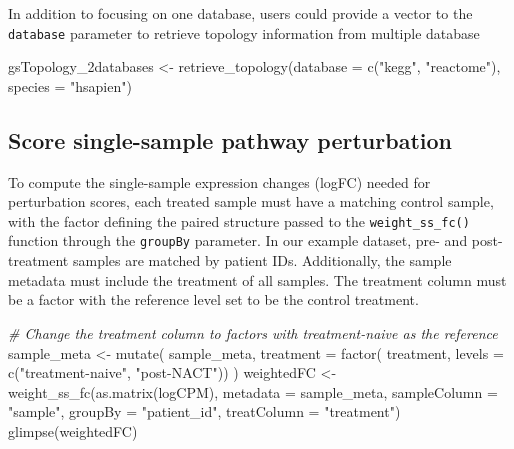 \documentclass[9pt,a4paper,]{extarticle}
\newenvironment{Shaded}{\begin{snugshade}}{\end{snugshade}}
\newcommand{\AttributeTok}[1]{\textcolor[rgb]{0.77,0.63,0.00}{#1}}
\newcommand{\CommentTok}[1]{\textcolor[rgb]{0.56,0.35,0.01}{\textit{#1}}}
\newcommand{\FunctionTok}[1]{\textcolor[rgb]{0.00,0.00,0.00}{#1}}
\newcommand{\NormalTok}[1]{#1}
\newcommand{\OtherTok}[1]{\textcolor[rgb]{0.56,0.35,0.01}{#1}}
\newcommand{\StringTok}[1]{\textcolor[rgb]{0.31,0.60,0.02}{#1}}
\begin{document}
In addition to focusing on one database, users could provide a vector to the \texttt{database} parameter to retrieve topology information from multiple database

\begin{Shaded}
\begin{Highlighting}[]
\NormalTok{gsTopology\_2databases }\OtherTok{\textless{}{-}} \FunctionTok{retrieve\_topology}\NormalTok{(}\AttributeTok{database =} \FunctionTok{c}\NormalTok{(}\StringTok{"kegg"}\NormalTok{, }\StringTok{"reactome"}\NormalTok{), }
                                           \AttributeTok{species =} \StringTok{"hsapien"}\NormalTok{)}
\end{Highlighting}
\end{Shaded}

\hypertarget{score-single-sample-pathway-perturbation}{%
\subsection{Score single-sample pathway perturbation}\label{score-single-sample-pathway-perturbation}}

To compute the single-sample expression changes (logFC) needed for perturbation scores, each treated sample must have a matching control sample, with the factor defining the paired structure passed to the \texttt{weight\_ss\_fc()} function through the \texttt{groupBy} parameter.
In our example dataset, pre- and post-treatment samples are matched by patient IDs.
Additionally, the sample metadata must include the treatment of all samples. The treatment column must be a factor with the reference level set to be the control treatment.

\begin{Shaded}
\begin{Highlighting}[]
\CommentTok{\# Change the treatment column to factors with treatment{-}naive as the reference}
\NormalTok{sample\_meta }\OtherTok{\textless{}{-}} \FunctionTok{mutate}\NormalTok{(}
\NormalTok{    sample\_meta, }
    \AttributeTok{treatment =} \FunctionTok{factor}\NormalTok{(}
\NormalTok{        treatment, }\AttributeTok{levels =} \FunctionTok{c}\NormalTok{(}\StringTok{"treatment{-}naive"}\NormalTok{, }\StringTok{"post{-}NACT"}\NormalTok{))}
\NormalTok{)}
\NormalTok{weightedFC }\OtherTok{\textless{}{-}} \FunctionTok{weight\_ss\_fc}\NormalTok{(}\FunctionTok{as.matrix}\NormalTok{(logCPM), }\AttributeTok{metadata =}\NormalTok{ sample\_meta,}
 \AttributeTok{sampleColumn =} \StringTok{"sample"}\NormalTok{, }\AttributeTok{groupBy =} \StringTok{"patient\_id"}\NormalTok{, }\AttributeTok{treatColumn =} \StringTok{"treatment"}\NormalTok{)}
\FunctionTok{glimpse}\NormalTok{(weightedFC)}
\end{Highlighting}
\end{Shaded}
\end{document}
